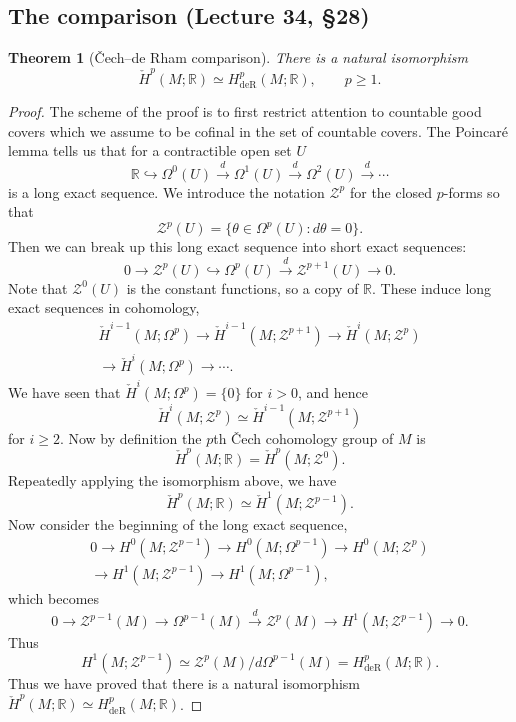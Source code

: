 \documentclass[UTF8,11pt,a4paper]{ctexart}
\newtheorem*{theorem}{Theorem}
\theoremstyle{definition}\newtheorem*{definition}{Definition}
\theoremstyle{remark}\newtheorem*{remark}{Remark}
\newcommand{\R}{\mathbb R}
\begin{document}
\subsection*{The comparison (Lecture 34, \S28)}
\begin{theorem}[\v Cech--de Rham comparison]
There is a natural isomorphism
\[
\check H^p(M;\R)\simeq H^p_{\mathrm{deR}}(M;\R),\qquad p\ge1.
\]
\end{theorem}
\begin{proof}
The scheme of the proof is to first restrict attention to countable good covers which we assume to be cofinal in the set of countable covers. The Poincar\'e lemma tells us that for a contractible open set $U$
\[
\R\hookrightarrow\Omega^0(U)\xrightarrow d\Omega^1(U)
\xrightarrow d\Omega^2(U)\xrightarrow d\cdots
\]
is a long exact sequence. We introduce the notation $\mathcal Z^p$ for the closed $p$-forms so that
\[
\mathcal Z^p(U)=\{\theta\in\Omega^p(U):d\theta=0\}.
\]
Then we can break up this long exact sequence into short exact sequences:
\[
0\longrightarrow\mathcal Z^p(U)\hookrightarrow\Omega^p(U)
\xrightarrow d\mathcal Z^{p+1}(U)\longrightarrow0.
\]
Note that $\mathcal Z^0(U)$ is the constant functions, so a copy of $\R$. These induce long exact sequences in cohomology,
\begin{multline*}
\check H^{i-1}(M;\Omega^p)\longrightarrow\check H^{i-1}(M;\mathcal Z^{p+1})
\longrightarrow\check H^i(M;\mathcal Z^p)\\
\longrightarrow\check H^i(M;\Omega^p)\longrightarrow\cdots.
\end{multline*}
We have seen that $\check H^i(M;\Omega^p)=\{0\}$ for $i>0$, and hence
\[
\check H^i(M;\mathcal Z^p)\simeq\check H^{i-1}(M;\mathcal Z^{p+1})
\]
for $i\ge2$. Now by definition the $p$th \v Cech cohomology group of $M$ is
\[
\check H^p(M;\R)=\check H^p(M;\mathcal Z^0).
\]
Repeatedly applying the isomorphism above, we have
\[
\check H^p(M;\R)\simeq\check H^1(M;\mathcal Z^{p-1}).
\]
Now consider the beginning of the long exact sequence,
\begin{multline*}
0\longrightarrow H^0(M;\mathcal Z^{p-1})\longrightarrow H^0(M;\Omega^{p-1})
\longrightarrow H^0(M;\mathcal Z^p)\\
\longrightarrow H^1(M;\mathcal Z^{p-1})\longrightarrow H^1(M;\Omega^{p-1}),
\end{multline*}
which becomes
\[
0\longrightarrow\mathcal Z^{p-1}(M)\longrightarrow\Omega^{p-1}(M)
\xrightarrow d\mathcal Z^p(M)\longrightarrow H^1(M;\mathcal Z^{p-1})\longrightarrow0.
\]
Thus
\[
H^1(M;\mathcal Z^{p-1})\simeq\mathcal Z^p(M)/d\Omega^{p-1}(M)
=H^p_{\mathrm{deR}}(M;\R).
\]
Thus we have proved that there is a natural isomorphism
$\check H^p(M;\R)\simeq H^p_{\mathrm{deR}}(M;\R)$.
\end{proof}
\end{document}
